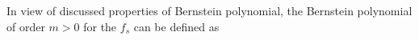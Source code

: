 \begin{comment}


When the underlying density $f$ is known to be continuous and compactly supported, following \cite{babu2002application}, the Bernstein estimator of $f$ of order $m > 0$ is

\begin{equation}
    \hat{f}_{m,n}(x) = m\displaystyle\sum_{k=0}^{m-1}\left[F_n\left(\frac{k+1}{m}\right)-F_n\left(\frac{k}{m}\right)\right] P_{k,m-1}(x)
\end{equation}

where $P_{k,m}(x) = \binom{m}{k} x^k(1-x)^{(m-k)}$ are binomial probabilities, as it is defined by \cite{babu2002application}. As \cite{vitale1975bernstein} stated the form of the Bernstein polynomial estimate of $f(x)$ is one of a linear combination of beta densities with random coefficients based on the observation.
Note that $\hat{f}_{m,n}(x)$ is the derivative of $\hat{F}_{m,n}(x)$ with respect to x.
Hence, the polynomial  of degree $m$ with coefficients depending on the data , $\hat{F}_{m,n}(x)$, is defined as

\begin{equation}
    \hat{F}_{m,n}(x) = \displaystyle\sum_{k=0}^{m}F_n\left(\frac{k}{m}\right) P_{k,m}(x)
\end{equation}

where $F_n$ denotes the empirical distribution function obtained from a random sample of size $n$. Hence, the Bernstein polynomial of order $m$ of $F$ is denoted as $B_m(x)$ :
\begin{equation}
B_m(x) = \displaystyle\sum_{k=0}^{m}F\left(\frac{k}{m}\right) P_{k,m}(x)
\end{equation}

It is clear to inspect $E[\hat{F}_{m,n}(x)] = B_m(x)$ for all $x \in [0,1]$ and all $n \geq  1$ . For all $k$, $F_{m,n}$ is non-decreasing and non-negative first derivative  in $x$ emanated from
\begin{equation}
F_{m,n}(0) = 0 = F(0) = B_m(0) \;\;and \;\; F_{m,n}(1) = 1 = F(1) = B_m(1)
\end{equation}
 the asymptotic properties of $\hat{F}_{m,n} $, $\hat{f}_{m,n}$, and other more details are examined in a paper by \cite{babu2002application}. \\ \\
\end{comment}

 In view of discussed properties of Bernstein polynomial, the Bernstein polynomial of order $m>0$ for the $f_s$ can be defined as

